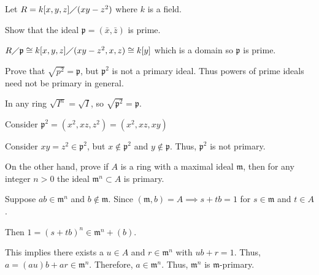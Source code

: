 \documentclass[12pt, letterpaper]{article}
\newcommand{\p}{\mathfrak{p}}
\newcommand{\mf}[1]{\mathfrak{#1}}
\begin{document}
\begin{problem}{}
    Let $R=k[x,y,z] \diagup (xy-z^2)$ where  $k$ is a field.
\end{problem}

\begin{subproblem}{}
    Show that the ideal $\p = (\bar{x},\bar{z})$ is prime.
\end{subproblem}
\begin{problemproof}
    $R \diagup \p \cong k[x,y,z] \diagup (xy-z^2,x,z) \cong  k[y]$ which is a domain so $\p$ is prime.
\end{problemproof}

\begin{subproblem}{}
    Prove that $\sqrt{p^2} = \p$, but $\p^2$ is not a primary ideal. Thus powers of prime ideals need not be primary in general.
\end{subproblem}
\begin{problemproof}
    In any ring $\sqrt{I^n}=\sqrt{I}$, so $\sqrt{\p^2}=\p$.

    Consider $\p^2=(x^2,xz,z^2)=(x^2,xz,xy)$

    Consider $xy=z^2 \in \p^2$, but $x \notin \p^2$ and $y \notin \p$. Thus, $\p^2$ is not primary.
\end{problemproof}

\begin{subproblem}{}
    On the other hand, prove if $A$ is a ring with a maximal ideal $\mf{m}$, then for any integer $n>0$ the ideal $\mf{m}^n \subset A$ is primary.
\end{subproblem}
\begin{problemproof}
    Suppose $ab \in \mf{m}^n$ and $b \notin \mf{m}$. Since $(\mf{m},b) = A \implies s+tb=1$ for $s \in \mf{m}$ and $t \in A$. 
    
    Then $1=(s+tb)^n \in \mf{m}^n + (b)$.

    This implies there exists a $u \in A$ and $r \in \mf{m}^n$ with $ub+r=1$. Thus, $a=(au)b+ar \in \mf{m}^n$. Therefore, $a \in \mf{m}^n$. Thus, $\mf{m}^n$ is $\mf{m}$-primary.
\end{problemproof}
\end{document}
